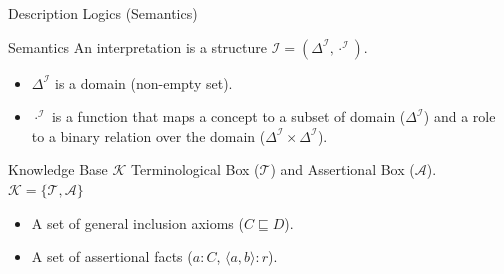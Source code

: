 \documentclass{beamer}
\begin{document}
% 
% 

\begin{frame}{Description Logics (Semantics)}
	\begin{block}{Semantics}
 An interpretation is a structure $\mathcal{I}=(\Delta^\mathcal{I},\cdot^\mathcal{I})$.
 \begin{itemize}
  \item $\Delta^\mathcal{I}$ is a domain (non-empty set).
   \item $\cdot^\mathcal{I}$ is a function that maps a concept to a subset of domain ($\Delta^\mathcal{I}$) and a role to a binary relation over the domain ($\Delta^\mathcal{I}\times \Delta^\mathcal{I}$).
 \end{itemize}
\end{block}

\begin{block}{Knowledge Base $\mathcal{K}$}
Terminological Box ($\mathcal{T}$) and Assertional Box ($\mathcal{A}$).
$\mathcal{K}=\{\mathcal{T},\mathcal{A}\}$
\begin{itemize}
 \item A set of general inclusion axioms ($C\sqsubseteq D$).
 \item A set of assertional facts ($a:C$, $\langle a,b\rangle: r$).
\end{itemize}

\end{block}
\end{frame}
\end{document}
